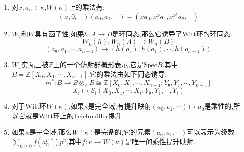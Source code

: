\begin{enumerate}
\begin{proof}
		\qquad
		
		对于一般的交换环$A$,它可以表示为$R/I$,其中$R$没有$p$挠元,那么上一段说明$W_n(R)$的确是环,记$W_n(I)=\{(a_0,a_1,\cdots,a_{n-1})\mid a_i\in I\}$,它是$W_n(R)$的理想,并且有$W_n(R/I)=W_n(R)/W_n(I)$.这说明$W_n(A)$是环.
	\end{proof}
    \item 对$x,a_n\in\kappa$,$W(\kappa)$上的乘法有:
    $$(x,0,\cdots)(a_0,a_1,\cdots)=(xa_0,x^pa_1,x^{p^2}a_2,\cdots)$$
    \item $W_n$和$W$具有函子性,如果$h:A\to B$是环同态,那么它诱导了Witt环的环同态:
    $$W_n(h):W_n(A)\to W_n(B)$$
    $$(a_0,a_1,\cdots,a_{n-1})\mapsto(h(a_0),h(a_1),\cdots,h(a_{n-1}))$$
    \item $W_n$实际上被$\mathbb{Z}$上的一个仿射群概形表示,它是$\mathrm{Spec}B$,其中$B=\mathbb{Z}[X_0,X_1,\cdots,X_{n-1}]$.它的乘法由如下同态诱导:
    $$m^*:B\to B\otimes_{\mathbb{Z}}B\cong\mathbb{Z}[X_0,X_1,\cdots,X_{n-1};Y_0,Y_1,\cdots,Y_{n-1}]$$
    $$X_i\mapsto S_i(X_0,X_1,\cdots,X_i;Y_0,Y_1,\cdots,Y_i)$$
    \item 对于Witt环$W(\kappa)$,如果$\kappa$是完全域,有提升映射$(a_0,a_1,\cdots)\mapsto a_0$是乘性的,所以它就是Witt环上的Teichm\"uller提升.
    \item 如果$\kappa$是完全域,那么$W(\kappa)$是完备的,它的元素$(a_0,a_1,\cdots)$可以表示为级数$\sum_{n\ge0}f(a_n^{p^{-n}})p^n$,其中$f:\kappa\to W(\kappa)$是唯一的乘性提升映射.
\end{enumerate}

